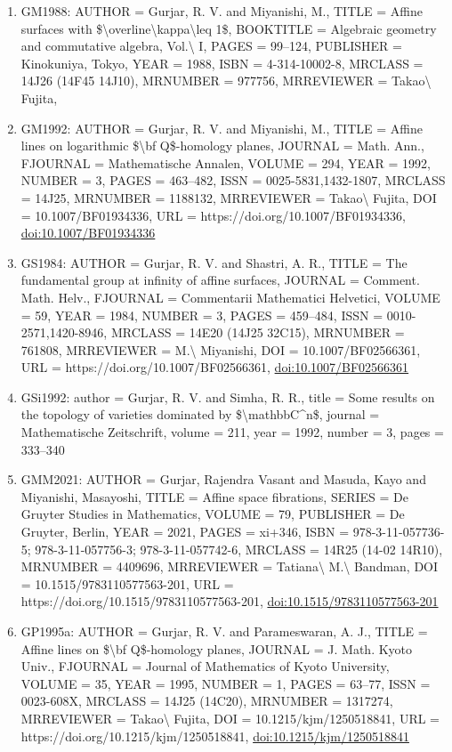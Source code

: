\documentclass[11pt]{article}
\begin{document}
\begin{enumerate}[leftmargin=*]
  \item GM1988: AUTHOR = Gurjar, R. V. and Miyanishi, M., TITLE = Affine surfaces with \$\textbackslash{}overline\textbackslash{}kappa\textbackslash{}leq 1\$, BOOKTITLE = Algebraic geometry and commutative algebra, Vol.\textbackslash{} I, PAGES = 99--124, PUBLISHER = Kinokuniya, Tokyo, YEAR = 1988, ISBN = 4-314-10002-8, MRCLASS = 14J26 (14F45 14J10), MRNUMBER = 977756, MRREVIEWER = Takao\textbackslash{} Fujita,
  \item GM1992: AUTHOR = Gurjar, R. V. and Miyanishi, M., TITLE = Affine lines on logarithmic \$\textbackslash{}bf Q\$-homology planes, JOURNAL = Math. Ann., FJOURNAL = Mathematische Annalen, VOLUME = 294, YEAR = 1992, NUMBER = 3, PAGES = 463--482, ISSN = 0025-5831,1432-1807, MRCLASS = 14J25, MRNUMBER = 1188132, MRREVIEWER = Takao\textbackslash{} Fujita, DOI = 10.1007/BF01934336, URL = https://doi.org/10.1007/BF01934336, \href{https://doi.org/10.1007/BF01934336}{doi:10.1007/BF01934336}
  \item GS1984: AUTHOR = Gurjar, R. V. and Shastri, A. R., TITLE = The fundamental group at infinity of affine surfaces, JOURNAL = Comment. Math. Helv., FJOURNAL = Commentarii Mathematici Helvetici, VOLUME = 59, YEAR = 1984, NUMBER = 3, PAGES = 459--484, ISSN = 0010-2571,1420-8946, MRCLASS = 14E20 (14J25 32C15), MRNUMBER = 761808, MRREVIEWER = M.\textbackslash{} Miyanishi, DOI = 10.1007/BF02566361, URL = https://doi.org/10.1007/BF02566361, \href{https://doi.org/10.1007/BF02566361}{doi:10.1007/BF02566361}
  \item GSi1992: author = Gurjar, R. V. and Simha, R. R., title = Some results on the topology of varieties dominated by \$\textbackslash{}mathbbC\^{}n\$, journal = Mathematische Zeitschrift, volume = 211, year = 1992, number = 3, pages = 333--340
  \item GMM2021: AUTHOR = Gurjar, Rajendra Vasant and Masuda, Kayo and Miyanishi, Masayoshi, TITLE = Affine space fibrations, SERIES = De Gruyter Studies in Mathematics, VOLUME = 79, PUBLISHER = De Gruyter, Berlin, YEAR = 2021, PAGES = xi+346, ISBN = 978-3-11-057736-5; 978-3-11-057756-3; 978-3-11-057742-6, MRCLASS = 14R25 (14-02 14R10), MRNUMBER = 4409696, MRREVIEWER = Tatiana\textbackslash{} M.\textbackslash{} Bandman, DOI = 10.1515/9783110577563-201, URL = https://doi.org/10.1515/9783110577563-201, \href{https://doi.org/10.1515/9783110577563-201}{doi:10.1515/9783110577563-201}
  \item GP1995a: AUTHOR = Gurjar, R. V. and Parameswaran, A. J., TITLE = Affine lines on \$\textbackslash{}bf Q\$-homology planes, JOURNAL = J. Math. Kyoto Univ., FJOURNAL = Journal of Mathematics of Kyoto University, VOLUME = 35, YEAR = 1995, NUMBER = 1, PAGES = 63--77, ISSN = 0023-608X, MRCLASS = 14J25 (14C20), MRNUMBER = 1317274, MRREVIEWER = Takao\textbackslash{} Fujita, DOI = 10.1215/kjm/1250518841, URL = https://doi.org/10.1215/kjm/1250518841, \href{https://doi.org/10.1215/kjm/1250518841}{doi:10.1215/kjm/1250518841}

\end{enumerate}
\end{document}
